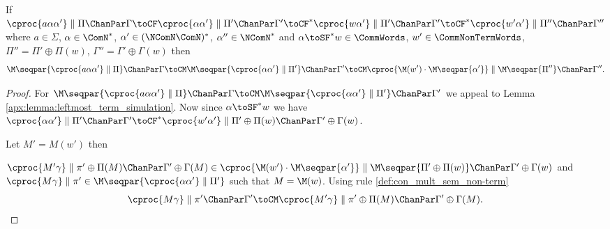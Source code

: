 \begin{lemma}\label{apx:lemma:nonterm_sideeffect_partialpop}
If 
$\cproc{a\alpha\alpha'}   \parallel \Pi \ChanPar \Gamma \toCF 
	\cproc{\alpha\alpha'} \parallel \Pi' \ChanPar \Gamma' \toCF^* 
	\cproc{w\alpha'}      \parallel \Pi' \ChanPar \Gamma' \toCF^* 
	\cproc{w'\alpha'}     \parallel \Pi'' \ChanPar \Gamma''$ 
where ${a \in \Sigma}$, 
	  $\alpha \in \ComN^*$, 
	  $\alpha' \in (\NComN \ComN)^*$, 
	  $\alpha'' \in \NComN^*$ and
	  ${\alpha \toSF^* w \in \CommWords}$, 
	  $w' \in \CommNonTermWords$,
	  $\Pi'' = \Pi' \oplus \Pi(w)$, 
	  $\Gamma'' = \Gamma' \oplus \Gamma(w)$
then 
$$\M\seqpar{\cproc{a\alpha\alpha'} \parallel \Pi} \ChanPar \Gamma \toCM \M\seqpar{\cproc{\alpha\alpha'} \parallel \Pi'} \ChanPar \Gamma' \toCM  \cproc{\M(w') \cdot \M\seqpar{\alpha'}} \parallel \M\seqpar{\Pi''} \ChanPar \Gamma''.$$
\end{lemma}
\begin{proof}
For
 $\M\seqpar{\cproc{a\alpha\alpha'} \parallel \Pi} \ChanPar \Gamma \toCM 
  \M\seqpar{\cproc{\alpha\alpha'} \parallel \Pi'} \ChanPar \Gamma' $
we appeal to Lemma \ref{apx:lemma:leftmost_term_simulation}.
Now since $\alpha \toSF^* w$ we have 
$\cproc{\alpha\alpha'} \parallel \Pi' \ChanPar \Gamma' \toCF^* 
\cproc{w'\alpha'} \parallel \Pi' \oplus \Pi(w) \ChanPar \Gamma' \oplus \Gamma(w)$.

Let $M' = M(w')$ then

$\cproc{M'\gamma} \parallel \pi' \oplus \Pi(M) \ChanPar \Gamma' \oplus \Gamma(M) \in \cproc{\M(w') \cdot \M\seqpar{\alpha'}} \parallel \M\seqpar{\Pi' \oplus \Pi(w)} \ChanPar \Gamma' \oplus \Gamma(w)$
and
$\cproc{M\gamma} \parallel \pi' \in \M\seqpar{\cproc{\alpha\alpha'} \parallel \Pi'}$ such that $M = \M(w)$.
Using rule \ref{def:con_mult_sem_non-term}
$$\cproc{M\gamma} \parallel \pi' \ChanPar \Gamma' \toCM \cproc{M'\gamma} \parallel \pi' \oplus \Pi(M) \ChanPar \Gamma' \oplus \Gamma(M).$$
\end{proof}

